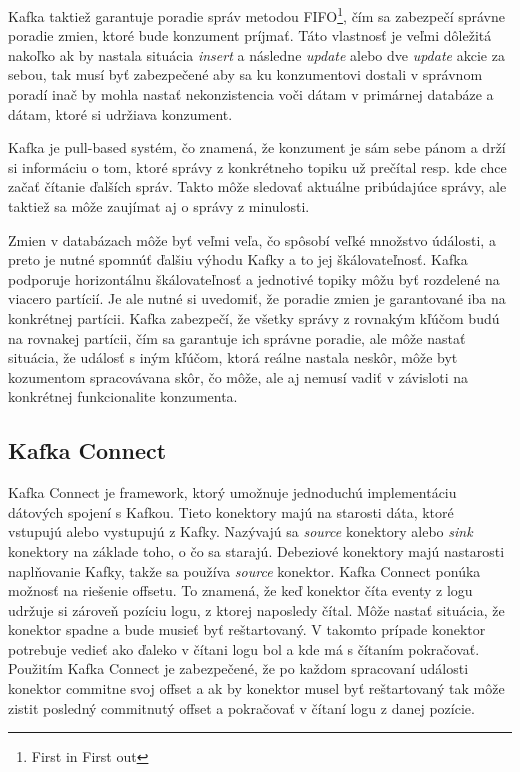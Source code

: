 Kafka taktiež garantuje poradie správ metodou FIFO\footnote{First in First out}, čím sa zabezpečí správne poradie zmien, ktoré bude konzument príjmať. Táto vlastnosť je veľmi dôležitá nakoľko ak by nastala situácia \textit{insert} a následne \textit{update} alebo dve \textit{update} akcie za sebou, tak musí byť zabezpečené aby sa ku konzumentovi dostali v správnom poradí inač by mohla nastať nekonzistencia voči dátam v primárnej databáze a dátam, ktoré si udržiava konzument.

Kafka je pull-based systém, čo znamená, že konzument je sám sebe pánom a drží si informáciu o tom, ktoré správy z konkrétneho topiku už prečítal resp. kde chce začať čítanie ďalších správ. Takto môže sledovať aktuálne pribúdajúce správy, ale taktiež sa môže zaujímat aj o správy z minulosti.

Zmien v databázach môže byť veľmi veľa, čo spôsobí veľké množstvo údálosti, a preto je nutné spomnúť ďalšiu výhodu Kafky a to jej škálovateľnosť. Kafka podporuje horizontálnu škálovateľnosť a jednotivé topiky môžu byť rozdelené na viacero partícií. Je ale nutné si uvedomiť, že poradie zmien je garantované iba na konkrétnej partícii. Kafka zabezpečí, že všetky správy z rovnakým kľúčom budú na rovnakej partícii, čím sa garantuje ich správne poradie, ale môže nastať situácia, že událosť s iným kľúčom, ktorá reálne nastala neskôr, môže byt kozumentom spracovávana skôr, čo môže, ale aj nemusí vadiť v závisloti na konkrétnej funkcionalite konzumenta.

\subsection{Kafka Connect}
Kafka Connect je framework, ktorý umožnuje jednoduchú implementáciu dátových spojení s Kafkou. Tieto konektory majú na starosti dáta, ktoré vstupujú alebo vystupujú z Kafky. Nazývajú sa \textit{source} konektory alebo \textit{sink} konektory na základe toho, o čo sa starajú. Debeziové konektory majú nastarosti naplňovanie Kafky, takže sa používa \textit{source} konektor. Kafka Connect ponúka možnosť na riešenie offsetu. To znamená, že keď konektor číta eventy z logu udržuje si zároveň pozíciu logu, z ktorej naposledy čítal. Môže nastať situácia, že konektor spadne a bude musieť byť reštartovaný. V takomto prípade konektor potrebuje vedieť ako ďaleko v čítani logu bol a kde má s čítaním pokračovať. Použitím Kafka Connect je zabezpečené, že po každom spracovaní události konektor commitne svoj offset a ak by konektor musel byť reštartovaný tak môže zistit posledný commitnutý offset a pokračovať v čítaní logu z danej pozície.

